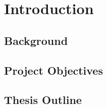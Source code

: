 \section*{Introduction}

\subsection{Background}

\subsection{Project Objectives}

\subsection{Thesis Outline}

\newpage
